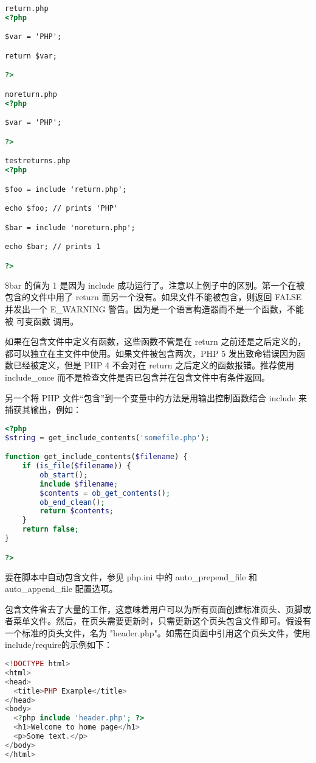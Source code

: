 \begin{lstlisting}[language=HTML]
return.php
<?php

$var = 'PHP';

return $var;

?>

noreturn.php
<?php

$var = 'PHP';

?>

testreturns.php
<?php

$foo = include 'return.php';

echo $foo; // prints 'PHP'

$bar = include 'noreturn.php';

echo $bar; // prints 1

?>
\end{lstlisting}


\$bar 的值为 1 是因为 include 成功运行了。注意以上例子中的区别。第一个在被包含的文件中用了 return 而另一个没有。如果文件不能被包含，则返回 FALSE 并发出一个 E\_WARNING 警告。因为是一个语言构造器而不是一个函数，不能被 可变函数 调用。

如果在包含文件中定义有函数，这些函数不管是在 return 之前还是之后定义的，都可以独立在主文件中使用。如果文件被包含两次，PHP 5 发出致命错误因为函数已经被定义，但是 PHP 4 不会对在 return 之后定义的函数报错。推荐使用 include\_once 而不是检查文件是否已包含并在包含文件中有条件返回。

另一个将 PHP 文件“包含”到一个变量中的方法是用输出控制函数结合 include 来捕获其输出，例如：


\begin{lstlisting}[language=PHP]
<?php
$string = get_include_contents('somefile.php');

function get_include_contents($filename) {
    if (is_file($filename)) {
        ob_start();
        include $filename;
        $contents = ob_get_contents();
        ob_end_clean();
        return $contents;
    }
    return false;
}

?>
\end{lstlisting}

要在脚本中自动包含文件，参见 php.ini 中的 auto\_prepend\_file 和 auto\_append\_file 配置选项。

包含文件省去了大量的工作，这意味着用户可以为所有页面创建标准页头、页脚或者菜单文件。然后，在页头需要更新时，只需更新这个页头包含文件即可。假设有一个标准的页头文件，名为 "header.php"。如需在页面中引用这个页头文件，使用 include/require的示例如下：


\begin{lstlisting}[language=PHP]
<!DOCTYPE html>
<html>
<head>
  <title>PHP Example</title>
</head>
<body>
  <?php include 'header.php'; ?>
  <h1>Welcome to home page</h1>
  <p>Some text.</p>
</body>
</html>
\end{lstlisting}

